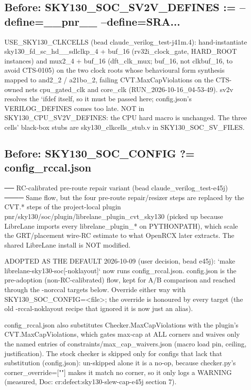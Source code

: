\begin{record}
\subsection*{Before: SKY130\_SOC\_SV2V\_DEFINES := --define=\_\_pnr\_\_ --define=SRA...}

\begin{textblock}

USE_SKY130_CLKCELLS (bead claude_verilog_test-j41m.4): hand-instantiate sky130_fd_sc_hd__sdlclkp_4 + buf_16
(rv32i_clock_gate, HARD_ROOT instances) and mux2_4 + buf_16 (dft_clk_mux; buf_16, not clkbuf_16, to avoid CTS-0105) on the two clock roots whose
behavioural form synthesis mapped to and2_2 / a21bo_2, failing CVT.MaxCapViolations on the CTS-owned nets
cpu_gated_clk and core_clk (RUN_2026-10-16_04-53-49). sv2v resolves the `ifdef itself, so it must be passed here;
config.json's VERILOG_DEFINES comes too late. NOT in SKY130_CPU_SV2V_DEFINES: the CPU hard macro is unchanged.
The three cells' black-box stubs are sky130_clkcells_stub.v in SKY130_SOC_SV_FILES.
\end{textblock}

\subsection*{Before: SKY130\_SOC\_CONFIG ?= config\_rccal.json}

\begin{textblock}
── RC-calibrated pre-route repair variant (bead claude_verilog_test-e45j) ────
Same flow, but the four pre-route repair/resizer steps are replaced by the CVT.* steps of the
project-local plugin pnr/sky130/soc/plugin/librelane_plugin_cvt_sky130 (picked up because
LibreLane imports every librelane_plugin_* on PYTHONPATH), which scale the GRT/placement wire-RC
estimate to what OpenRCX later extracts. The shared LibreLane install is NOT modified.

ADOPTED AS THE DEFAULT 2026-10-09 (user decision, bead e45j): `make librelane-sky130-soc[-noklayout]` now runs
config_rccal.json. config.json is the pre-adoption (non-RC-calibrated) flow, kept for A/B comparison and
reached through the -norccal targets below. Override either way with SKY130_SOC_CONFIG=<file>; the override
is honoured by every target (the old -rccal-noklayout recipe that ignored it is now just an alias).

config_rccal.json also substitutes Checker.MaxCapViolations with the plugin's CVT.MaxCapViolations, which
gates max-cap at ALL corners and waives only the named entries of constraints/max_cap_waivers.json (macro
load pin, ceiling, justification). The stock checker is skipped only for configs that lack that substitution
(config.json): un-skipped alone it is a no-op, because checker.py's corner_override=[""] makes it match no
corner, so it only logs a WARNING (measured, Doc: cr:defect:sky130-slew-cap-e45j section 7).
\end{textblock}


\end{record}
